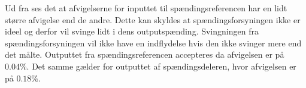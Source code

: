 Ud fra  ses det at afvigelserne for inputtet til spændingsreferencen har en lidt større afvigelse end de andre. Dette kan skyldes at spændingsforsyningen ikke er ideel og derfor vil svinge lidt i dens outputspænding. Svingningen fra spændingsforsyningen vil ikke have en indflydelse hvis den ikke svinger mere end det målte. Outputtet fra spændingsreferencen accepteres da afvigelsen er på $0.04 \%$. Det samme gælder for outputtet af spændingsdeleren, hvor afvigelsen er på $0.18 \%$.





 